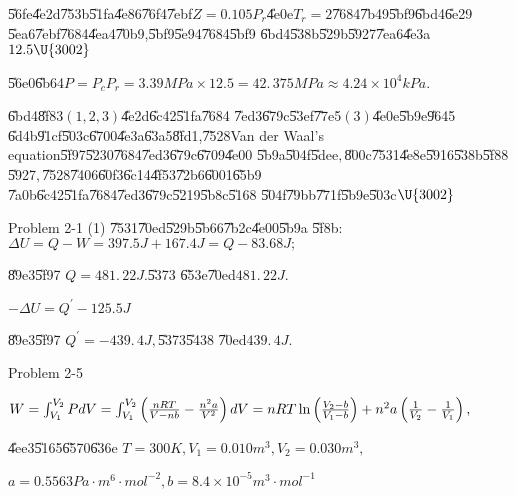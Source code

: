 \documentclass{article}
\begin{document}

\U{56fe}\U{4e2d}\U{753b}\U{51fa}\U{4e86}\U{76f4}\U{7ebf}$\allowbreak
Z=0.105P_{r}$\U{4e0e}$T_{r}=2$\U{7684}\U{7b49}\U{5bf9}\U{6bd4}\U{6e29}%
\U{5ea6}\U{7ebf}\U{7684}\U{4ea4}\U{70b9},\U{5bf9}\U{5e94}\U{7684}\U{5bf9}%
\U{6bd4}\U{538b}\U{529b}\U{5927}\U{7ea6}\U{4e3a}$12.5\U{3002} $

\U{56e0}\U{6b64}$P=P_{c}P_{r}=3.39\unit{MPa}\times 12.5=\allowbreak
42.\,\allowbreak 375\unit{MPa}\approx 4.24\times 10^{4}\unit{kPa}.$

\U{6bd4}\U{8f83}$\left( 1,2,3\right) $\U{4e2d}\U{6c42}\U{51fa}\U{7684}%
\U{7ed3}\U{679c}\U{53ef}\U{77e5}$\left( 3\right) $\U{4e0e}\U{5b9e}\U{9645}%
\U{6d4b}\U{91cf}\U{503c}\U{6700}\U{4e3a}\U{63a5}\U{8fd1},\U{7528}Van der
Waal's equation\U{5f97}\U{5230}\U{7684}\U{7ed3}\U{679c}\U{6709}\U{4e00}%
\U{5b9a}\U{504f}\U{5dee}$,$\U{800c}\U{7531}\U{4e8e}\U{5916}\U{538b}\U{5f88}%
\U{5927}$,$\U{7528}\U{7406}\U{60f3}\U{6c14}\U{4f53}\U{72b6}\U{6001}\U{65b9}%
\U{7a0b}\U{6c42}\U{51fa}\U{7684}\U{7ed3}\U{679c}\U{5219}\U{5b8c}\U{5168}%
\U{504f}\U{79bb}\U{771f}\U{5b9e}\U{503c}$\U{3002} $

Problem 2-1 (1) \U{7531}\U{70ed}\U{529b}\U{5b66}\U{7b2c}\U{4e00}\U{5b9a}%
\U{5f8b}:$\Delta U=Q-W=397.5\unit{J}+167.4\unit{J}=Q-83.68\unit{J};$

\U{89e3}\U{5f97} $Q=\allowbreak 481.\,\allowbreak 22\unit{J}.$\U{5373}%
\U{653e}\U{70ed}$\allowbreak 481.\,\allowbreak 22\unit{J}.$

$-\Delta U=Q^{\prime }-125.5\unit{J}$

\U{89e3}\U{5f97} $Q^{\prime }=-439.\,\allowbreak 4\unit{J},$\U{5373}\U{5438}%
\U{70ed}$439.\,\allowbreak 4\unit{J}.$

Problem 2-5

$W=\int_{V_{1}}^{V_{2}}PdV=\int_{V_{1}}^{V_{2}}\left( \frac{nRT}{V-nb}-\frac{%
n^{2}a}{V^{2}}\right) dV=nRT\ln \left( \frac{V_{2}-b}{V_{1}-b}\right)
+n^{2}a\left( \frac{1}{V_{2}}-\frac{1}{V_{1}}\right) ,$

\U{4ee3}\U{5165}\U{6570}\U{636e} $T=300\unit{K},V_{1}=0.010\unit{m}%
^{3},V_{2}=0.030\unit{m}^{3},$

$a=0.5563\unit{Pa}\cdot \unit{m}^{6}\cdot \unit{mol}^{-2},b=8.4\times 10^{-5}%
\unit{m}^{3}\cdot \unit{mol}^{-1}$
\end{document}

